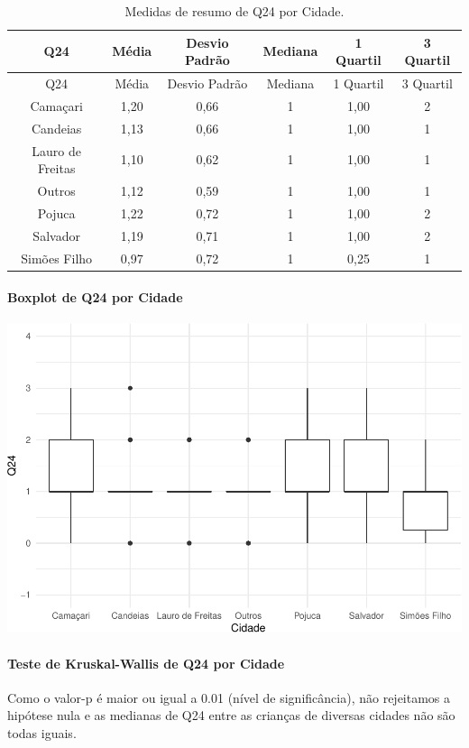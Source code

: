 \documentclass[]{article}
\let\oldparagraph\paragraph
\renewcommand{\paragraph}[1]{\oldparagraph{#1}\mbox{}}
\begin{document}
\begin{longtable}[]{@{}cccccc@{}}
\caption{\label{tab:unnamed-chunk-606}Medidas de resumo de Q24 por Cidade.}\tabularnewline
\toprule
Q24 & Média & Desvio Padrão & Mediana & 1 Quartil & 3 Quartil\tabularnewline
\midrule
\endfirsthead
\toprule
Q24 & Média & Desvio Padrão & Mediana & 1 Quartil & 3 Quartil\tabularnewline
\midrule
\endhead
Camaçari & 1,20 & 0,66 & 1 & 1,00 & 2\tabularnewline
Candeias & 1,13 & 0,66 & 1 & 1,00 & 1\tabularnewline
Lauro de Freitas & 1,10 & 0,62 & 1 & 1,00 & 1\tabularnewline
Outros & 1,12 & 0,59 & 1 & 1,00 & 1\tabularnewline
Pojuca & 1,22 & 0,72 & 1 & 1,00 & 2\tabularnewline
Salvador & 1,19 & 0,71 & 1 & 1,00 & 2\tabularnewline
Simões Filho & 0,97 & 0,72 & 1 & 0,25 & 1\tabularnewline
\bottomrule
\end{longtable}

\hypertarget{boxplot-de-q24-por-cidade}{%
\paragraph{Boxplot de Q24 por Cidade}\label{boxplot-de-q24-por-cidade}}

\begin{center}\includegraphics[width=0.75\linewidth]{relatorio_covid19_files/figure-latex/unnamed-chunk-607-1} \end{center}

\hypertarget{teste-de-kruskal-wallis-de-q24-por-cidade}{%
\paragraph{Teste de Kruskal-Wallis de Q24 por Cidade}\label{teste-de-kruskal-wallis-de-q24-por-cidade}}

Como o valor-p é maior ou igual a 0.01 (nível de significância), não rejeitamos a hipótese nula e as medianas de Q24 entre as crianças de diversas cidades não são todas iguais.
\end{document}
